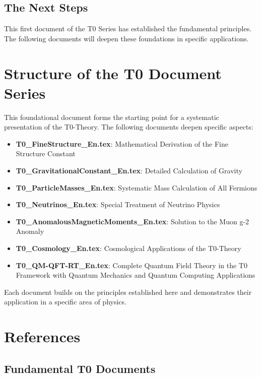 \documentclass[12pt,a4paper]{article}
\begin{document}
	\subsection{The Next Steps}
	
	This first document of the T0 Series has established the fundamental principles. The following documents will deepen these foundations in specific applications.
	
	\section{Structure of the T0 Document Series}
	
	This foundational document forms the starting point for a systematic presentation of the T0-Theory. The following documents deepen specific aspects:
	
	\begin{itemize}
		\item \textbf{T0\_FineStructure\_En.tex}: Mathematical Derivation of the Fine Structure Constant
		\item \textbf{T0\_GravitationalConstant\_En.tex}: Detailed Calculation of Gravity
		\item \textbf{T0\_ParticleMasses\_En.tex}: Systematic Mass Calculation of All Fermions
		\item \textbf{T0\_Neutrinos\_En.tex}: Special Treatment of Neutrino Physics
		\item \textbf{T0\_AnomalousMagneticMoments\_En.tex}: Solution to the Muon g-2 Anomaly
		\item \textbf{T0\_Cosmology\_En.tex}: Cosmological Applications of the T0-Theory
		\item \textbf{T0\_QM-QFT-RT\_En.tex}: Complete Quantum Field Theory in the T0 Framework with Quantum Mechanics and Quantum Computing Applications
	\end{itemize}
	
	Each document builds on the principles established here and demonstrates their application in a specific area of physics.
	
	\section{References}
	
	\subsection{Fundamental T0 Documents}
	
\end{document}
